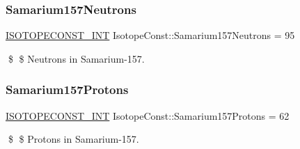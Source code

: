 \subsubsection{\texorpdfstring{Samarium157\+Neutrons}{Samarium157Neutrons}}
{\footnotesize\ttfamily \mbox{\hyperlink{group___isotope_const-_macros_ga5f18360b3e99483a35c32d789e62621c}{I\+S\+O\+T\+O\+P\+E\+C\+O\+N\+S\+T\+\_\+\+I\+NT}} Isotope\+Const\+::\+Samarium157\+Neutrons = 95}

\$ \$ Neutrons in Samarium-\/157. \mbox{\label{group___isotope_const-_samarium-_sm157_ga107644ebd6011560b7737e4b2193993a}} 
\subsubsection{\texorpdfstring{Samarium157\+Protons}{Samarium157Protons}}
{\footnotesize\ttfamily \mbox{\hyperlink{group___isotope_const-_macros_ga5f18360b3e99483a35c32d789e62621c}{I\+S\+O\+T\+O\+P\+E\+C\+O\+N\+S\+T\+\_\+\+I\+NT}} Isotope\+Const\+::\+Samarium157\+Protons = 62}

\$ \$ Protons in Samarium-\/157. 